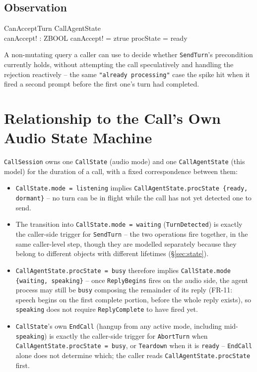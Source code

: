 \documentclass[a4paper,10pt,fleqn]{article}
\begin{document}
\subsection{Observation}

\begin{schema}{CanAcceptTurn}
  \Xi CallAgentState \\
  canAccept! : ZBOOL
  \where
  canAccept! = ztrue \iff procState = ready
\end{schema}

A non-mutating query a caller can use to decide whether \texttt{SendTurn}'s
precondition currently holds, without attempting the call speculatively and
handling the rejection reactively -- the same
\texttt{"already processing"} case the spike hit when it fired a second
prompt before the first one's turn had completed.

\section{Relationship to the Call's Own Audio State Machine}
\label{sec:relation}

\texttt{CallSession} owns one \texttt{CallState} (audio mode) and one
\texttt{CallAgentState} (this model) for the duration of a call, with a fixed
correspondence between them:

\begin{itemize}
  \item \texttt{CallState.mode = listening} implies
    \texttt{CallAgentState.procState \in \{ready, dormant\}} -- no turn can be
    in flight while the call has not yet detected one to send.
  \item The transition into \texttt{CallState.mode = waiting}
    (\texttt{TurnDetected}) is exactly the caller-side trigger for
    \texttt{SendTurn} -- the two operations fire together, in the same
    caller-level step, though they are modelled separately because they
    belong to different objects with different lifetimes (\S\ref{sec:state}).
  \item \texttt{CallAgentState.procState = busy} therefore implies
    \texttt{CallState.mode \in \{waiting, speaking\}} -- once
    \texttt{ReplyBegins} fires on the audio side, the agent process may still
    be \texttt{busy} composing the remainder of its reply (FR-11: speech
    begins on the first complete portion, before the whole reply exists),
    so \texttt{speaking} does not require \texttt{ReplyComplete} to have
    fired yet.
  \item \texttt{CallState}'s own \texttt{EndCall} (hangup from any active
    mode, including mid-\texttt{speaking}) is exactly the caller-side trigger
    for \texttt{AbortTurn} when \texttt{CallAgentState.procState = busy}, or
    \texttt{Teardown} when it is \texttt{ready} -- \texttt{EndCall} alone
    does not determine which; the caller reads
    \texttt{CallAgentState.procState} first.
\end{itemize}
\end{document}
